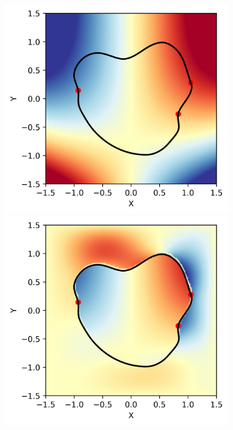 \documentclass{article}
\begin{document}
\begin{figure}[htb]
\centering
\begin{minipage}[t]{0.22\textwidth}
\centering
\includegraphics[width=0.9\textwidth]{CP_exact_1.png}
\end{minipage}
\begin{minipage}[t]{0.22\textwidth}
\centering
\includegraphics[width=0.9\textwidth]{CP_v1.png}
\end{minipage}

\end{figure}
\end{document}
